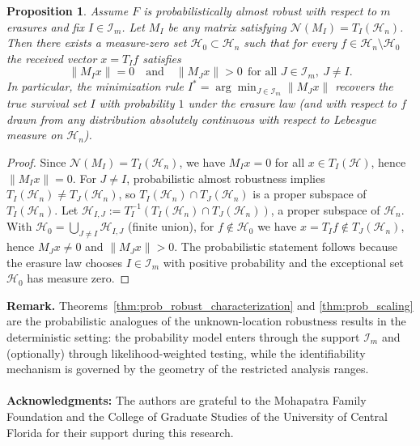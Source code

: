 \documentclass[final,1p,times]{elsarticle}
\newtheorem{prop}[thm]{Proposition}
\begin{document}
\begin{prop}
\label{thm:prob_identification}
Assume $F$ is probabilistically almost robust with respect to $m$ erasures and fix $I\in\mathcal I_m$.
Let $M_I$ be any matrix satisfying $\mathcal N(M_I)=T_I(\mathcal H_n)$.
Then there exists a measure-zero set $\mathcal H_0\subset\mathcal H_n$ such that for every $f\in\mathcal H_n\setminus\mathcal H_0$
the received vector $x=T_I f$ satisfies
\[
\|M_I x\|=0
\quad\text{and}\quad
\|M_J x\|>0\ \ \text{for all }J\in\mathcal I_m,\ J\neq I.
\]
In particular, the minimization rule $I^\ast=\arg\min_{J\in\mathcal I_m}\|M_J x\|$ recovers the true survival set $I$
with probability $1$ under the erasure law (and with respect to $f$ drawn from any distribution absolutely continuous
with respect to Lebesgue measure on $\mathcal H_n$).
\end{prop}

\begin{proof}
Since $\mathcal N(M_I)=T_I(\mathcal H_n)$, we have $M_I x=0$ for all $x\in T_I(\mathcal H)$, hence $\|M_I x\|=0$.
For $J\neq I$, probabilistic almost robustness implies $T_I(\mathcal H_n)\neq T_J(\mathcal H_n)$, so
$T_I(\mathcal H_n)\cap T_J(\mathcal H_n)$ is a proper subspace of $T_I(\mathcal H_n)$.
Let $\mathcal H_{I,J}:=T_I^{-1}(T_I(\mathcal H_n)\cap T_J(\mathcal H_n))$, a proper subspace of $\mathcal H_n$.
With $\mathcal H_0=\bigcup_{J\neq I}\mathcal H_{I,J}$ (finite union), for $f\notin\mathcal H_0$ we have
$x=T_I f\notin T_J(\mathcal H_n)$, hence $M_J x\neq 0$ and $\|M_J x\|>0$.
The probabilistic statement follows because the erasure law chooses $I\in\mathcal I_m$ with positive probability and the
exceptional set $\mathcal H_0$ has measure zero.
\end{proof}

\medskip
\noindent\textbf{Remark.}
Theorems~\ref{thm:prob_robust_characterization} and \ref{thm:prob_scaling} are the probabilistic analogues of the
unknown-location robustness results in the deterministic setting:
the probability model enters through the support $\mathcal I_m$ and (optionally) through likelihood-weighted testing,
while the identifiability mechanism is governed by the geometry of the restricted analysis ranges.
\\~\\

\noindent
	{\bf Acknowledgments:} 
	The authors are grateful to the Mohapatra Family Foundation and the College of Graduate Studies of the University of Central Florida for their support during this research.
	
\end{document}
